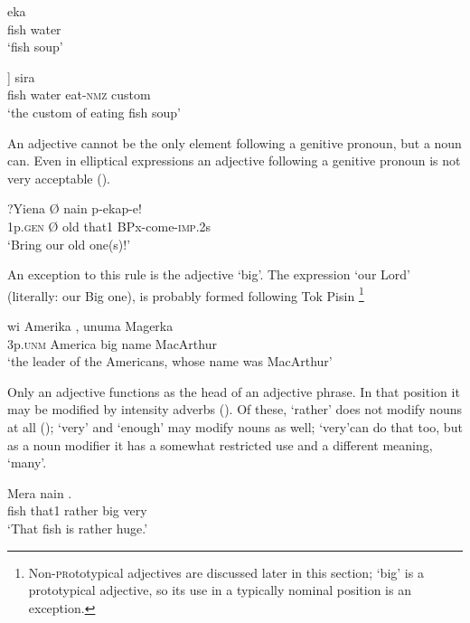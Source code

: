 \ea%
\label{ex:x15}
\gll {} eka \\
fish water\\
\glt`fish soup'
\z

\ea%
\label{ex:x16}
\gll [[\textstyleEmphasizedVernacularWords{mera} \textstyleEmphasizedVernacularWords{eka}] ] sira \\
fish water eat-\textsc{nmz} custom\\
\glt`the custom of eating fish soup'
\z

An adjective cannot be the only element following a genitive pronoun, but a noun can. Even in elliptical expressions an adjective following a genitive pronoun is not very acceptable (). 

\ea%
\label{ex:x17}
\gll ?Yiena {\O }  nain p-ekap-e! \\
1p.\textsc{gen} {\O} old that1 BPx-come-\textsc{imp}.2s\\
\glt`Bring our old one(s)!'
\z

An exception to this rule is the adjective  `big'. The expression  `our Lord' (literally: our Big one), is probably formed following Tok Pisin \footnote{Non-\textsc{pr}ototypical adjectives are discussed later in this section; `big' is a prototypical adjective, so its use in a typically nominal position is an exception.} 

\ea%
\label{ex:x105}
\gll wi Amerika , unuma Magerka \\
3p.\textsc{unm} America big name MacArthur\\
\glt`the leader of the Americans, whose name was MacArthur'
\z

Only an adjective functions as the head of an adjective phrase. In that position it may be modified by intensity adverbs (). Of these,  `rather' does not modify nouns at all ();  `very' and  `enough' may modify nouns as well;  `very'can do that too, but as a noun modifier it has a somewhat restricted use and a different meaning, `many'.

\ea%
\label{ex:x18}
\gll Mera nain   . \\
fish that1 rather big very\\
\glt`That fish is rather huge.'
\z

